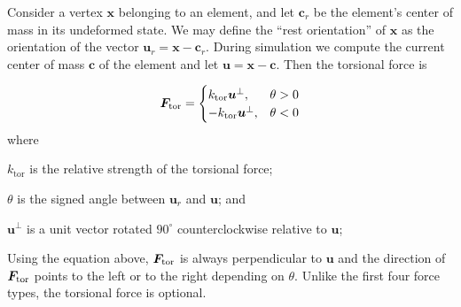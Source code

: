 Consider a vertex $\bm{x}$ belonging
to an element, and let $\bm{c}_r$ be the element's center of mass in
its undeformed state.  We may define the ``rest orientation'' of
$\bm{x}$ as the orientation of the vector $\bm{u}_r = \bm{x}-\bm{c}_r$.
During simulation we compute the current center of mass $\bm{c}$ of 
the element and let $\bm{u}=\bm{x}-\bm{c}$.  Then the torsional force
is

\begin{equation}
  \bm{F}_\mathrm{tor} =\begin{cases}
    k_\mathrm{tor}\bm{u}^\perp, & \theta > 0\\
    -k_\mathrm{tor}\bm{u}^\perp, & \theta < 0
  \end{cases}
\end{equation}
where
\begin{packeddescriptions}
	\item[$k_\mathrm{tor}$]  is the relative strength of the torsional force;
	\item[$\theta$] is the signed angle between $\bm{u}_r$ and $\bm{u}$; and
	\item[$\bm{u}^\perp$] is a unit vector rotated $90^\circ$
		counterclockwise relative to $\bm{u}$;
\end{packeddescriptions}

Using the equation above, $\bm{F}_\mathrm{tor}$ is always perpendicular to $\bm{u}$
and the direction of $\bm{F}_\mathrm{tor}$ points to the left or to the right depending on $\theta$.
Unlike the first four force types, the torsional force is optional.


